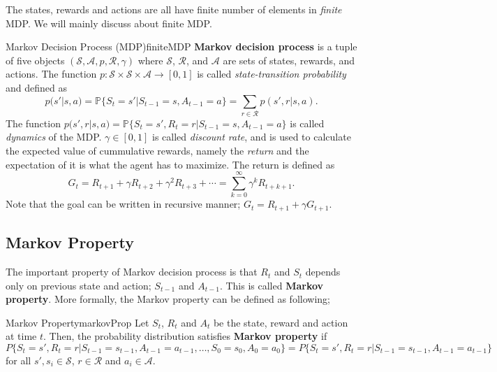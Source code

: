 \documentclass[../../main.tex]{subfiles}
\begin{document}
        The states, rewards and actions are all have finite number of elements in \emph{finite} MDP. We will mainly discuss about finite MDP.
        \begin{defn}{Markov Decision Process (MDP)}{finiteMDP}
            \textbf{Markov decision process} is a tuple of five objects $(\mathcal{S},\mathcal{A}, p, \mathcal{R}, \gamma)$
            where $\mathcal{S}$, $\mathcal{R}$, and $\mathcal{A}$ are sets of states, rewards, and actions.
            The function $p:\mathcal{S}\times\mathcal{S}\times\mathcal{A}\to[0,1]$ is called \emph{state-transition probability}
            and defined as
            \[
            p(s'|s,a)=\mathbb{P}\{S_t=s'|S_{t-1}=s,A_{t-1}=a\} = \sum_{r \in \mathcal{R}}p(s',r|s,a).
            \]
            The function $p(s',r|s,a)=\mathbb{P}\{S_t=s',R_t=r|S_{t-1}=s,A_{t-1}=a\}$ is called \emph{dynamics} of the MDP.
            $\gamma \in [0,1]$ is called \emph{discount rate}, and is used to calculate the expected value of cummulative rewards, namely the \emph{return}
            and the expectation of it is what the agent has to maximize. The return is defined as
            \[
            G_t=R_{t+1} + \gamma R_{t+2} + \gamma^2 R_{t+3} + \cdots = \sum_{k=0}^{\infty} \gamma^k R_{t+k+1}.
            \]
            Note that the goal can be written in recursive manner; $G_t = R_{t+1} + \gamma G_{t+1}$.
        \end{defn}
    \subsection{Markov Property}
        The important property of Markov decision process is that $R_t$ and $S_t$ depends only on previous state and action; $S_{t-1}$ and $A_{t-1}$.
        This is called \textbf{Markov property}. More formally, the Markov property can be defined as following;
        \begin{defn}{Markov Property}{markovProp}
            Let $S_t$, $R_t$ and $A_t$ be the state, reward and action at time $t$. Then, the probability distribution satisfies \textbf{Markov property} if
            \begin{equation*}
            P\{S_t=s',R_t=r|S_{t-1}=s_{t-1}, A_{t-1}=a_{t-1},\dots,S_0=s_0,A_0=a_0\}
            = P\{S_t=s',R_t=r|S_{t-1}=s_{t-1}, A_{t-1}=a_{t-1}\}
            \end{equation*}
            for all $s',s_i \in \mathcal{S}$, $r \in \mathcal{R}$ and $a_i \in \mathcal{A}$.
        \end{defn}
\end{document}
